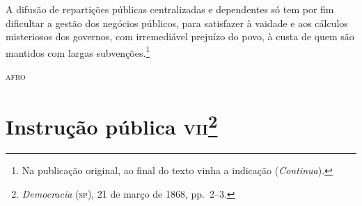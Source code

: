 A difusão de repartições públicas centralizadas e dependentes só tem por
fim dificultar a gestão dos negócios públicos, para satisfazer à vaidade
e aos cálculos misteriosos dos governos, com irremediável prejuízo do
povo, à custa de quem são mantidos com largas subvenções.\footnote{Na publicação original, ao final do texto vinha a indicação (\emph{Continua}).}

\begin{flushright}
\textsc{afro}
\end{flushright}

\chapter{Instrução pública \textsc{vii}\footnote{\emph{Democracia} (\textsc{sp}),
  21 de março de 1868, pp.~2--3.}} %

